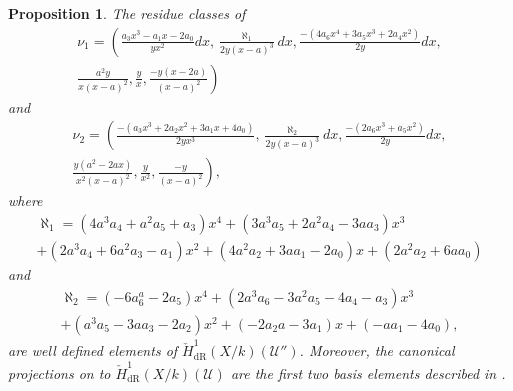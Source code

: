 \documentclass[draft, 11pt]{article} %
\theoremstyle{plain}
\newtheorem{prop}[defn]{Proposition}
\theoremstyle{remark}
\newcommand{\cU}{{\mathcal U}}
\newcommand{\cechderhamhone}{\check{H}_{\text {dR}}^1(X/k)}
\begin{document}
\begin{prop}\label{basis22}
The residue classes of
\begin{multline*}
\nu_1 = \left(\frac{a_3x^3-a_1x-2a_0}{yx^2}dx, \frac{\aleph_1}{2y(x-a)^3}dx, \frac{-(4a_6x^4+3a_5x^3+2a_4x^2)}{2y}dx,  \right. \\ \left. \frac{a^2y}{x(x-a)^2}, \frac{y}{x},  \frac{-y(x-2a)}{(x-a)^2} \right)
\end{multline*}
and
\begin{multline*}
\nu_2 = \left( \frac{-(a_3x^3+2a_2x^2+3a_1x+4a_0)}{2yx^3},  \frac{\aleph_2}{2y(x-a)^3}dx, \frac{-(2a_6x^3+a_5x^2)}{2y}dx, \right. \\ \left.  \frac{y(a^2-2ax)}{x^2(x-a)^2},\frac{y}{x^2}, \frac{-y}{(x-a)^2} \right),
\end{multline*}
where
\begin{multline*}
\aleph_1  = (4a^3a_4+a^2a_5+a_3)x^4 + (3a^3a_5+2a^2a_4-3aa_3)x^3 \\
 + (2a^3a_4 + 6a^2a_3 - a_1)x^2 + (4a^2a_2 +3aa_1-2a_0)x+(2a^2a_2+6aa_0)
\end{multline*}
and
\begin{multline*}
\aleph_2  = (-6a^a_6-2a_5)x^4 + (2a^3a_6-3a^2a_5-4a_4-a_3)x^3 \\ + (a^3a_5-3aa_3-2a_2)x^2 + (-2a_2a-3a_1)x +(-aa_1-4a_0),
\end{multline*}
are well defined elements of $\cechderhamhone(\cU'')$.
Moreover, the canonical projections on to $\cechderhamhone(\cU)$ are the first two basis elements described in \cite[Thm. 2.3]{derhamactions}.
\end{prop}
\end{document}

